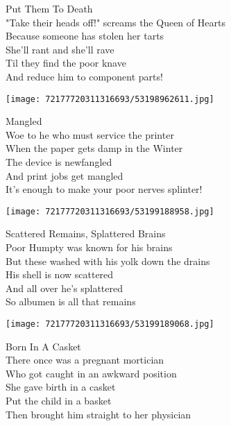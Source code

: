 \documentclass[10pt,letterpaper]{article}
\begin{document}
\begin{center}
Put Them To Death\\
\vskip 0.2in
"Take their heads off!" screams the Queen of Hearts\\
Because someone has stolen her tarts\\
She'll rant and she'll rave\\
Til they find the poor knave\\
And reduce him to component parts!\\
\end{center}
\pagebreak

\begin{center}\texttt{[image: 72177720311316693/53198962611.jpg]}
\end{center}
\begin{center}
Mangled\\
\vskip 0.2in
Woe to he who must service the printer\\
When the paper gets damp in the Winter\\
The device is newfangled\\
And print jobs get mangled\\
It's enough to make your poor nerves splinter!\\
\end{center}
\pagebreak

\begin{center}
\texttt{[image: 72177720311316693/53199188958.jpg]}
\end{center}

\begin{center}
Scattered Remains, Splattered Brains\\
\vskip 0.2in
Poor Humpty was known for his brains\\
But these washed with his yolk down the drains\\
His shell is now scattered\\
And all over he's splattered\\
So albumen is all that remains\\
\end{center}
\pagebreak

\begin{center}\texttt{[image: 72177720311316693/53199189068.jpg]}
\end{center}
\begin{center}
Born In A Casket\\
\vskip 0.2in
There once was a pregnant mortician\\
Who got caught in an awkward position\\
She gave birth in a casket\\
Put the child in a basket\\
Then brought him straight to her physician\\
\end{center}
\pagebreak
\end{document}
